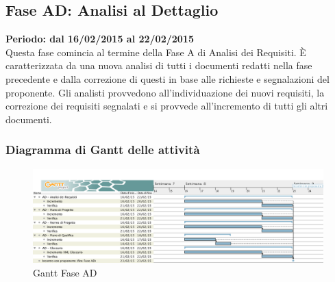 \subsection{Fase AD: Analisi al Dettaglio}
\textbf{Periodo: dal 16/02/2015 al 22/02/2015}
\\
Questa fase comincia al termine della Fase A di Analisi dei Requisiti. È caratterizzata da una nuova analisi di tutti i documenti redatti nella fase precedente e dalla correzione di questi in base alle richieste e segnalazioni del proponente. Gli analisti provvedono all'individuazione dei nuovi requisiti, la correzione dei requisiti segnalati e si provvede all'incremento di tutti gli altri documenti.
\subsubsection{Diagramma di Gantt delle attività}
\begin{center}
	\begin{figure}[H]\centering
		\includegraphics[width=\textwidth]{PianoDiProgetto/Pics/FaseAD.png}
		\caption{Gantt Fase AD}
	\end{figure}
\end{center}